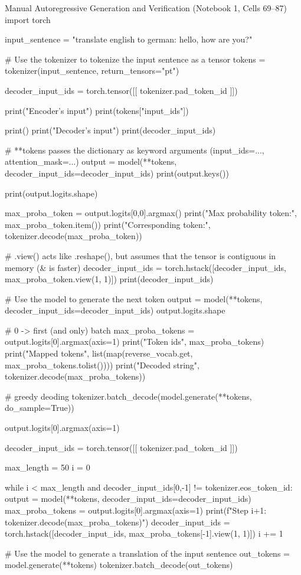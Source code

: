 \documentclass[11pt,a4paper]{article}
\begin{document}
\begin{solutioncode}[label=lst:manual_greedy_decoding]{Manual Autoregressive Generation and Verification (Notebook 1, Cells 69--87)}
import torch

input_sentence = "translate english to german: hello, how are you?"

# Use the tokenizer to tokenize the input sentence as a tensor
tokens = tokenizer(input_sentence, return_tensors="pt")

decoder_input_ids = torch.tensor([[ tokenizer.pad_token_id ]])

print("Encoder's input")
print(tokens["input_ids"])

print()
print("Decoder's input")
print(decoder_input_ids)

# **tokens passes the dictionary as keyword arguments (input_ids=..., attention_mask=...)
output = model(**tokens, decoder_input_ids=decoder_input_ids)
print(output.keys())

print(output.logits.shape)

max_proba_token = output.logits[0,0].argmax()
print("Max probability token:", max_proba_token.item())
print("Corresponding token:", tokenizer.decode(max_proba_token))

# .view() acts like .reshape(), but assumes that the tensor is contiguous in memory (& is faster)
decoder_input_ids = torch.hstack([decoder_input_ids, max_proba_token.view(1, 1)])
print(decoder_input_ids)

# Use the model to generate the next token
output = model(**tokens, decoder_input_ids=decoder_input_ids)
output.logits.shape

# 0 -> first (and only) batch
max_proba_tokens = output.logits[0].argmax(axis=1)
print("Token ids", max_proba_tokens)
print("Mapped tokens", list(map(reverse_vocab.get, max_proba_tokens.tolist())))
print("Decoded string", tokenizer.decode(max_proba_tokens))

# greedy deoding
tokenizer.batch_decode(model.generate(**tokens, do_sample=True))

output.logits[0].argmax(axis=1)

decoder_input_ids = torch.tensor([[ tokenizer.pad_token_id ]])

max_length = 50
i = 0

while i < max_length and decoder_input_ids[0,-1] != tokenizer.eos_token_id:
    output = model(**tokens, decoder_input_ids=decoder_input_ids)
    max_proba_tokens = output.logits[0].argmax(axis=1)
    print(f"Step {i+1}: {tokenizer.decode(max_proba_tokens)}")
    decoder_input_ids = torch.hstack([decoder_input_ids, max_proba_tokens[-1].view(1, 1)])
    i += 1

# Use the model to generate a translation of the input sentence
out_tokens = model.generate(**tokens)
tokenizer.batch_decode(out_tokens)
\end{solutioncode}
\end{document}
